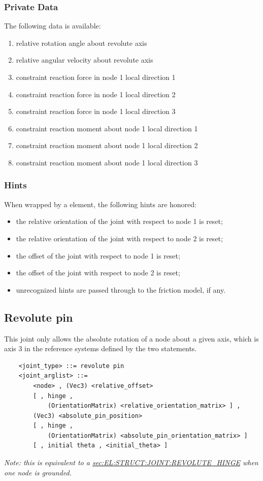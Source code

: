 \subsubsection{Private Data}
The following data is available:
\begin{enumerate}
\item {} relative rotation angle about revolute axis
\item {} relative angular velocity about revolute axis
\item {} constraint reaction force in node 1 local direction 1
\item {} constraint reaction force in node 1 local direction 2
\item {} constraint reaction force in node 1 local direction 3
\item {} constraint reaction moment about node 1 local direction 1
\item {} constraint reaction moment about node 1 local direction 2
\item {} constraint reaction moment about node 1 local direction 3
\end{enumerate}

\subsubsection{Hints}
When wrapped by a  element, the following hints are honored:
\begin{itemize}
\item {} the relative orientation of the joint
with respect to node 1 is reset;
\item {} the relative orientation of the joint
with respect to node 2 is reset;
\item {} the offset of the joint
with respect to node 1 is reset;
\item {} the offset of the joint
with respect to node 2 is reset;
\item unrecognized hints are passed through to the friction model,
if any.
\end{itemize}




\subsection{Revolute pin}
\label{sec:EL:STRUCT:JOINT:REVOLUTE_PIN}
This joint only allows the absolute rotation of a node about
a given axis, which is axis 3 in the reference systems defined 
by the two  statements.
\begin{verbatim}
    <joint_type> ::= revolute pin
    <joint_arglist> ::= 
        <node> , (Vec3) <relative_offset>
        [ , hinge , 
            (OrientationMatrix) <relative_orientation_matrix> ] ,
        (Vec3) <absolute_pin_position>
        [ , hinge , 
            (OrientationMatrix) <absolute_pin_orientation_matrix> ]
        [ , initial theta , <initial_theta> ]
\end{verbatim}
{\em
Note: this is equivalent to a
\hyperref{\kw{revolute hinge}}{\kw{revolute hinge} (see Section~}{)}{sec:EL:STRUCT:JOINT:REVOLUTE_HINGE}
when one node is grounded.
}

